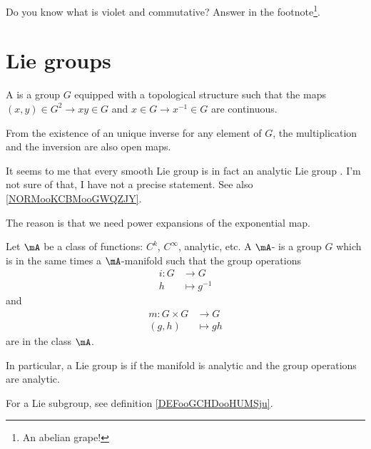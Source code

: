 
Do you know what is violet and commutative? Answer in the footnote\footnote{An abelian grape!}.


\section{Lie groups}

\begin{definition}      \label{DEFooCHZVooHnvSgW}
    A  is a group $G$ equipped with a topological structure such that the maps $(x,y)\in G^2\to xy\in G$ and $x\in G\to x^{-1}\in G$ are continuous.
\end{definition}

\begin{remark}\label{rem:ouvert}
From the existence of an unique inverse for any element of $G$, the multiplication and the inversion are also open maps.
\end{remark}


\begin{probleme}
    It seems to me that every smooth Lie group is in fact an analytic Lie group \cite{BIBooIMFVooPoybEp,BIBooTKQTooGjFxwB}. I'm not sure of that, I have not a precise statement. See also \ref{NORMooKCBMooGWQZJY}.

    The reason is that we need power expansions of the exponential map.
\end{probleme}

\begin{definition}      \label{DEFooGDWTooTvINuw}
    Let \( \mA\) be a class of functions: \( C^k\), \(  C^{\infty}\), analytic, etc. A \( \mA\)- is a group $G$ which is in the same times a \( \mA\)-manifold such that the group operations 
    \begin{equation}
        \begin{aligned}
            i\colon G&\to G \\
            h&\mapsto g^{-1} 
        \end{aligned}
    \end{equation}
    and
    \begin{equation}
        \begin{aligned}
            m\colon G\times G&\to G \\
            (g,h)&\mapsto gh 
        \end{aligned}
    \end{equation}
    are in the class \( \mA\).
 
    In particular, a Lie group is  if the manifold is analytic and the group operations are analytic.

\end{definition}
For a Lie subgroup, see definition \ref{DEFooGCHDooHUMSju}.

